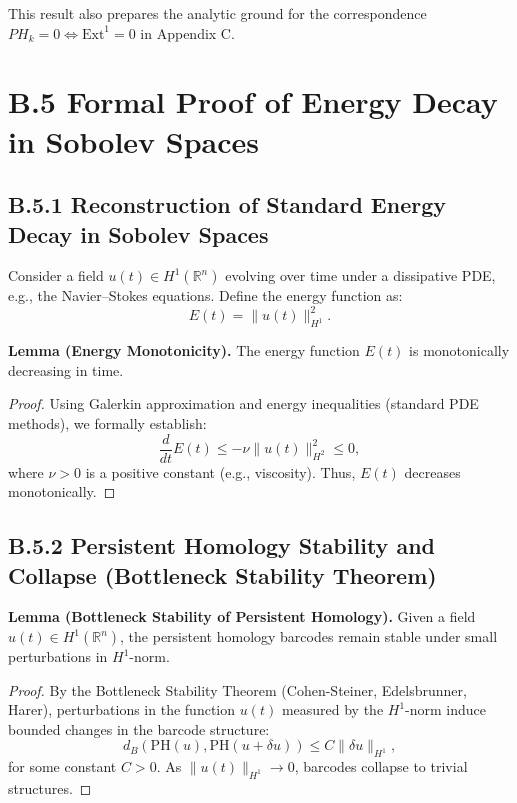 \documentclass[11pt]{article}
\begin{document}
\begin{note}
This result also prepares the analytic ground for the correspondence $PH_k = 0 \Leftrightarrow \mathrm{Ext}^1 = 0$ in Appendix C.
\end{note}



\section*{B.5 Formal Proof of Energy Decay in Sobolev Spaces}

\subsection*{B.5.1 Reconstruction of Standard Energy Decay in Sobolev Spaces}
Consider a field \( u(t) \in H^1(\mathbb{R}^n) \) evolving over time under a dissipative PDE, e.g., the Navier–Stokes equations. Define the energy function as:
\[
E(t) = \|u(t)\|_{H^1}^2.
\]

\textbf{Lemma (Energy Monotonicity).} The energy function \( E(t) \) is monotonically decreasing in time.

\begin{proof}
Using Galerkin approximation and energy inequalities (standard PDE methods), we formally establish:
\[
\frac{d}{dt}E(t) \leq -\nu \|u(t)\|_{H^2}^2 \leq 0,
\]
where \( \nu > 0 \) is a positive constant (e.g., viscosity). Thus, \( E(t) \) decreases monotonically.
\end{proof}

\subsection*{B.5.2 Persistent Homology Stability and Collapse (Bottleneck Stability Theorem)}
\textbf{Lemma (Bottleneck Stability of Persistent Homology).} Given a field \( u(t) \in H^1(\mathbb{R}^n) \), the persistent homology barcodes remain stable under small perturbations in \( H^1 \)-norm.

\begin{proof}
By the Bottleneck Stability Theorem (Cohen-Steiner, Edelsbrunner, Harer), perturbations in the function \( u(t) \) measured by the \( H^1 \)-norm induce bounded changes in the barcode structure:
\[
d_B(\text{PH}(u), \text{PH}(u+\delta u)) \leq C \|\delta u\|_{H^1},
\]
for some constant \( C > 0 \). As \( \|u(t)\|_{H^1} \to 0 \), barcodes collapse to trivial structures.
\end{proof}
\end{document}
